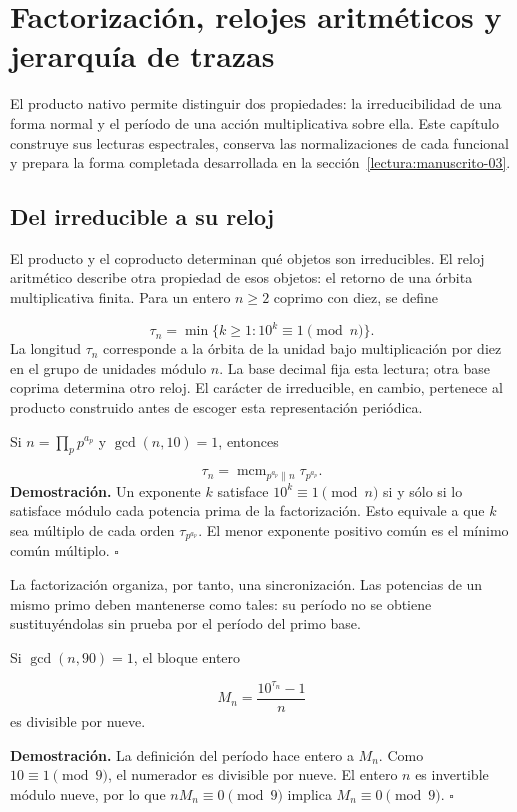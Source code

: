 \section{Factorización, relojes aritméticos y jerarquía de trazas}
\label{lectura:manuscrito-02}
El producto nativo permite distinguir dos propiedades: la irreducibilidad de una forma normal y el período de una acción multiplicativa sobre ella. Este capítulo construye sus lecturas espectrales, conserva las normalizaciones de cada funcional y prepara la forma completada desarrollada en la sección~\ref{lectura:manuscrito-03}.

\subsection{Del irreducible a su reloj}
El producto y el coproducto determinan qué objetos son irreducibles. El reloj aritmético describe otra propiedad de esos objetos: el retorno de una órbita multiplicativa finita. Para un entero $n\ge2$ coprimo con diez, se define

\[
\tau_n=\min\{k\ge1:10^k\equiv1\pmod n\}.
\]
La longitud $\tau_n$ corresponde a la órbita de la unidad bajo multiplicación por diez en el grupo de unidades módulo $n$. La base decimal fija esta lectura; otra base coprima determina otro reloj. El carácter de irreducible, en cambio, pertenece al producto construido antes de escoger esta representación periódica.

Si $n=\prod_p p^{a_p}$ y $\gcd(n,10)=1$, entonces

\[
\tau_n=\operatorname{mcm}_{p^{a_p}\parallel n}\tau_{p^{a_p}}.
\]
\textbf{Demostración.} Un exponente $k$ satisface $10^k\equiv1\pmod n$ si y sólo si lo satisface módulo cada potencia prima de la factorización. Esto equivale a que $k$ sea múltiplo de cada orden $\tau_{p^{a_p}}$. El menor exponente positivo común es el mínimo común múltiplo. \hfill\(\square\)

La factorización organiza, por tanto, una sincronización. Las potencias de un mismo primo deben mantenerse como tales: su período no se obtiene sustituyéndolas sin prueba por el período del primo base.

Si $\gcd(n,90)=1$, el bloque entero

\[
M_n=\frac{10^{\tau_n}-1}{n}
\]
es divisible por nueve.

\textbf{Demostración.} La definición del período hace entero a $M_n$. Como $10\equiv1\pmod9$, el numerador es divisible por nueve. El entero $n$ es invertible módulo nueve, por lo que $nM_n\equiv0\pmod9$ implica $M_n\equiv0\pmod9$. \hfill\(\square\)

